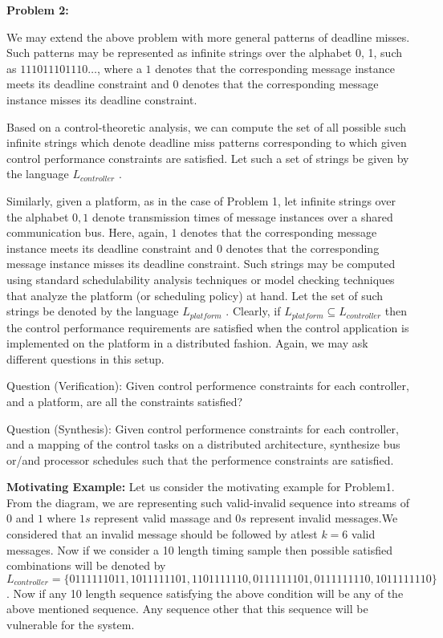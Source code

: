 

\textbf{Problem 2:}

We may extend the above problem with more general patterns of deadline
misses. Such patterns may be represented as infinite strings over the alphabet {0, 1},
such as $111011101110 \dots$, where a $1$ denotes that the corresponding
message instance meets its deadline constraint and $0$ denotes that the corresponding 
message instance misses its deadline constraint.

Based on a control-theoretic analysis, we can compute the set of all possible
such infinite strings which denote deadline miss patterns corresponding to which
given control performance constraints are satisfied. Let such a set of strings be
given by the language $L_{controller}$ .

Similarly, given a platform, as in the case of Problem 1, let infinite strings
over the alphabet ${0, 1}$ denote transmission times of message instances over a
shared communication bus. Here, again, $1$ denotes that the corresponding message
instance meets its deadline constraint and $0$ denotes that the corresponding
message instance misses its deadline constraint. Such strings may be computed
using standard schedulability analysis techniques or model checking techniques
that analyze the platform (or scheduling policy) at hand. Let the set of such
strings be denoted by the language $L_{platform}$ .
Clearly, if $L_{platform} \subseteq L_{controller}$ then the control performance requirements
are satisfied when the control application is implemented on the platform in a
distributed fashion.
Again, we may ask different questions in this setup.


Question (Verification): Given control performence constraints for each 
controller, and a platform, are all the constraints satisfied?

Question (Synthesis): Given control performence constraints for each controller,
and a mapping of the control tasks on a distributed architecture, synthesize
bus or/and processor schedules such that the performence constraints
are satisfied.


\textbf{Motivating Example:}
Let us consider the motivating example for Problem1. From the diagram, we  are representing
such valid-invalid sequence into streams of $0$ and $1$ where $1s$ represent valid massage
and $0s$ represent invalid messages.We considered that an invalid
message should be followed by atlest $k = 6$ valid messages. Now if we consider a 10
length timing sample then possible satisfied combinations will be denoted by $L_{controller}
= \{ 0111111011, 1011111101, 1101111110, 0111111101, 0111111110, 1011111110 \}$. Now if any 10 
length sequence satisfying the above condition will be any of the above mentioned sequence.
Any sequence other that this sequence will be vulnerable for the system.

